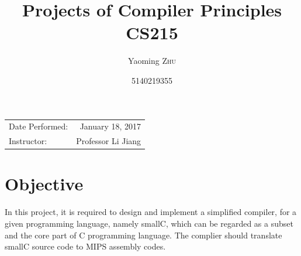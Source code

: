 \documentclass{article}
\title{Projects of Compiler Principles \\ CS215} %
\author{Yaoming \textsc{Zhu}} %
\date{5140219355} %
\begin{document}
\maketitle %

\begin{center}
\begin{tabular}{l r}
Date Performed: & January 18, 2017 \\ %

Instructor: & Professor Li Jiang %
\end{tabular}
\end{center}



\section{Objective}

In this project, it is required to design and implement a simplified compiler, for a given programming language, namely smallC, which can be regarded as a subset and the core part of C programming language. The complier should translate smallC source code to MIPS assembly codes. 

\end{document}
